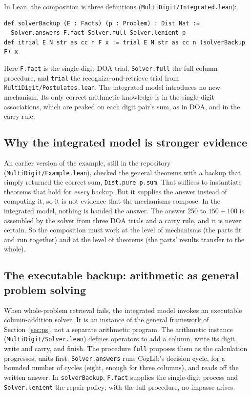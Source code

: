 \documentclass[11pt]{article}
\newcommand{\code}[1]{\texttt{#1}}
\begin{document}
In Lean, the composition is three definitions (\code{MultiDigit/Integrated.lean}):
\begin{Verbatim}[fontsize=\small]
def solverBackup (F : Facts) (p : Problem) : Dist Nat :=
  Solver.answers F.fact Solver.full Solver.lenient p
def itrial E N str as cc n F x := trial E N str as cc n (solverBackup F) x
\end{Verbatim}
Here \code{F.fact} is the single-digit DOA trial, \code{Solver.full} the full column procedure, and \code{trial} the recognize-and-retrieve trial from \code{MultiDigit/Postulates.lean}. The integrated model introduces no new mechanism. Its only correct arithmetic knowledge is in the single-digit associations, which are peaked on each digit pair's sum, as in DOA, and in the carry rule.

\subsection{Why the integrated model is stronger evidence}

An earlier version of the example, still in the repository (\code{MultiDigit/Example.lean}), checked the general theorems with a backup that simply returned the correct sum, \code{Dist.pure p.sum}. That suffices to instantiate theorems that hold for \emph{every} backup. But it supplies the answer instead of computing it, so it is not evidence that the mechanisms compose. In the integrated model, nothing is handed the answer. The answer 250 to $150+100$ is assembled by the solver from three DOA trials and a carry rule, and it is never certain. So the composition must work at the level of mechanisms (the parts fit and run together) and at the level of theorems (the parts' results transfer to the whole).

\subsection{The executable backup: arithmetic as general problem solving}

When whole-problem retrieval fails, the integrated model invokes an executable column-addition solver. It is an instance of the general framework of Section~\ref{sec:ps}, not a separate arithmetic program. The arithmetic instance (\code{MultiDigit/Solver.lean}) defines operators to add a column, write its digit, write and carry, and finish. The procedure \code{full} proposes them as the calculation progresses, units first. \code{Solver.answers} runs CogLib's decision cycle, for a bounded number of cycles (eight, enough for three columns), and reads off the written answer. In \code{solverBackup}, \code{F.fact} supplies the single-digit process and \code{Solver.lenient} the repair policy; with the full procedure, no impasse arises.
\end{document}
